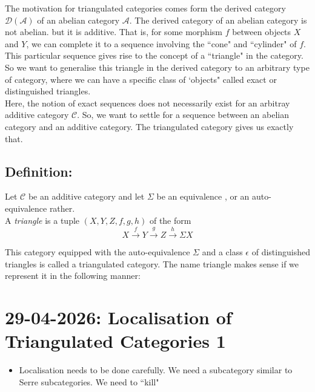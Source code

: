 \documentclass[12pt]{article}
\newcommand{\cat}[1]{\mathscr{#1}}
\begin{document}
The motivation for triangulated categories comes form the derived category $\mathcal{D}(\cat{A})$ of an abelian category $\cat{A}$. The derived category of an abelian category is not abelian. but it is additive. That is, for some morphism $f$ between objects $X$ and $Y$, we can complete it to a sequence involving the ``cone" and ``cylinder" of $f$.\\
This particular sequence gives rise to the concept of a ``triangle" in the category. So we want to generalise this triangle in the derived category to an arbitrary type of category, where we can have a specific class of `objects" called exact or distinguished triangles.\\

Here, the notion of exact sequences does not necessarily exist for an arbitray additive category $\cat{C}$. So, we want to settle for a sequence between an abelian category and an additive category. 
The triangulated category gives us exactly that.
\subsection{Definition: } 

Let $\cat{C}$ be an additive category and let $\Sigma$ be an equivalence , or an auto-equivalence rather.\\

A \textit{triangle} is a tuple $(X,Y,Z,f,g,h)$ of the form
\[
X\xrightarrow{f} Y\xrightarrow{g}Z\xrightarrow{h} \Sigma X
\]

This category equipped with the auto-equivalence $\Sigma$ and a class $\epsilon$ of distinguished triangles is called a triangulated category.
The name triangle makes sense if we represent it in the following manner:


\section*{29-04-2026: Localisation of Triangulated Categories 1}

\begin{itemize}
    \item Localisation needs to be done carefully. We need a subcategory similar to Serre subcategories. We need to ``kill" 
\end{itemize}
\end{document}
